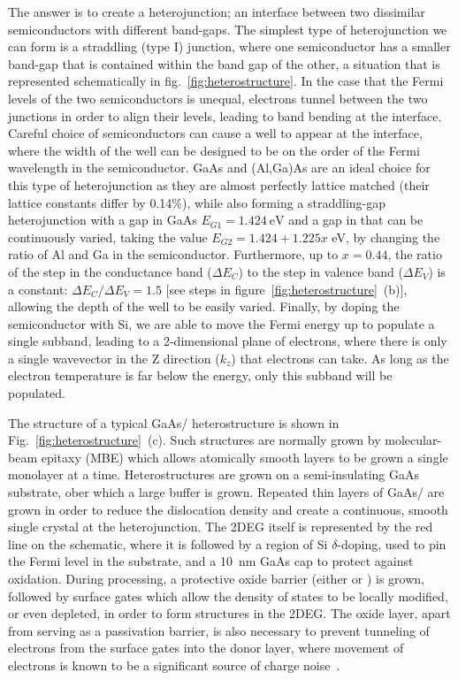 The answer is to create a heterojunction; an interface between two dissimilar semiconductors with different band-gaps. The
simplest type of heterojunction we can form is a straddling (type I) junction, where one semiconductor has a smaller band-gap
that is contained within the band gap of the other, a situation that is represented schematically in fig.~\ref{fig:heterostructure}.
In the case that the Fermi levels of the two semiconductors is unequal, electrons tunnel between the two junctions in order to align
their levels, leading to band bending at the interface. Careful choice of semiconductors can cause a well to appear at the interface,
where the width of the well can be designed to be on the order of the Fermi wavelength in the semiconductor. GaAs and (Al,Ga)As are
an ideal choice for this type of heterojunction as  they are almost perfectly lattice matched (their lattice constants differ by 0.14\%),
while also forming a straddling-gap heterojunction with a gap in GaAs $E_{G1} = \SI{1.424}{\electronvolt}$ and a gap in
 that can be continuously varied, taking the value $E_{G2} = 1.424 + 1.225x$ \si{\electronvolt}, by
changing the ratio of Al and Ga in the semiconductor. Furthermore, up to $x = 0.44$, the ratio of the step in the conductance
band ($\Delta E_C$) to the step in valence band ($\Delta E_V$) is a constant: $\Delta E_C/\Delta E_V = 1.5$\cite{adachi1993properties}
[see steps in figure~\ref{fig:heterostructure}~(b)], allowing the depth of the well to be easily varied.
Finally, by doping the semiconductor with Si, we are able to move the Fermi energy up to populate a single subband, leading to a
2-dimensional plane of electrons, where there is only a single wavevector in the Z direction ($k_z$) that electrons can take. As long
as the electron temperature is far below the energy, only this subband will be populated.

The structure of a typical GaAs/ heterostructure is shown in Fig.~\ref{fig:heterostructure}~(c). Such structures
are normally grown by molecular-beam epitaxy (MBE) which allows atomically smooth layers to be grown a single monolayer
at a time. Heterostructures are grown on a semi-insulating GaAs substrate, ober which a large buffer is grown.
Repeated thin layers of GaAs/ are grown in order to reduce the dislocation density
and create a continuous, smooth single crystal at the heterojunction. The 2DEG itself is represented by the red line
on the schematic, where it is followed by a region of Si $\delta$-doping, used to pin the Fermi level in the substrate, and
a \SI{10}{\nano\meter} GaAs cap to protect against oxidation. During processing, a protective oxide barrier (either 
or ) is grown, followed by surface gates which allow the density of states to be locally modified, or even depleted,
in order to form structures in the 2DEG. The oxide layer, apart from serving as a passivation barrier, is also necessary to
prevent tunneling of electrons from the surface gates into the donor layer, where movement of electrons is known to be a significant
source of charge noise~\cite{PhysRevB.72.115331,PhysRevApplied.9.034008}.

